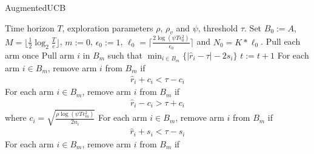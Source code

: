 \begin{algorithm}[th!]
\caption{AugmentedUCB}
\label{alg:augucb}
\begin{algorithmic}
 Time horizon $T$, exploration parameters $\rho$, $\rho_v$ and $\psi$, threshold $\tau$.
 Set $B_{0}:=A$, $M=\bigg\lfloor \frac{1}{2}\log_{2} \frac{T}{e}\bigg\rfloor $, $m:=0$, $\epsilon_{0}:=1$, $\ell_{0}=\big\lceil \frac{2\log(\psi T\epsilon_{0}^{2})}{\epsilon_{0}} \big\rceil$ and $N_{0}=K*\ell_{0} $.
\State Pull each arm once
\State {}
\State Pull arm $i$ in $B_m$ such that $\min_{i\in B_{m}}\bigg\lbrace |\hat{r}_{i} - \tau | - 2s_{i}\bigg\rbrace$
\State $t:=t+1$ 
\ArmElim
\State For each arm $i \in B_{m}$, remove arm ${i}$ from $B_{m}$ if
\begin{align*}
\hat{r}_{i} + c_i  < \tau - c_i
\end{align*}
\State For each arm $i \in B_{m}$, remove arm ${i}$ from $B_{m}$ if
\begin{align*}
\hat{r}_{i} - c_i  > \tau + c_i
\end{align*}
where $ c_i=\sqrt{\frac{\rho\log{(\psi T\epsilon_{m}^{2})}}{2 n_{i}}} $
\EndArmElim
\ArmElimV
\State For each arm $i \in B_{m}$, remove arm ${i}$ from $B_{m}$ if
\begin{align*}
\hat{r}_{i} + s_i  < \tau - s_i 
\end{align*}
\State For each arm $i \in B_{m}$, remove arm ${i}$ from $B_{m}$ if
\begin{align*}

\end{align*}
\end{algorithmic}
\end{algorithm}
